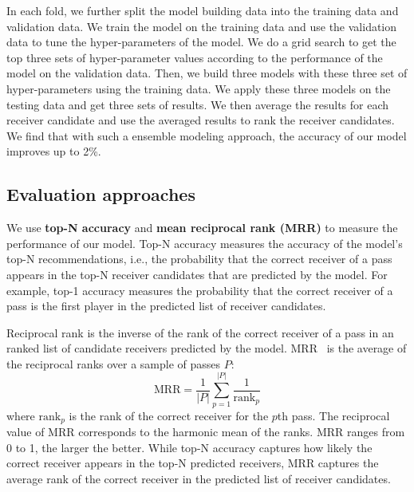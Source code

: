 In each fold, we further split the model building data into the training data and validation data.
We train the model on the training data and use the validation data to tune the hyper-parameters of the model. %
We do a grid search to get the top three sets of hyper-parameter values according to the performance of the model on the validation data.
Then, we build three models with these three set of hyper-parameters using the training data. 
We apply these three models on the testing data and get three sets of results.
We then average the results for each receiver candidate and use the averaged results to rank the receiver candidates. We find that with such a ensemble modeling approach, the accuracy of our model improves up to 2\%.%




\subsection{Evaluation approaches}\label{evaluation-approach}

We use \textbf{top-N accuracy} and \textbf{mean reciprocal rank (MRR)} to measure the performance of our model.
Top-N accuracy measures the accuracy of the model's top-N recommendations, i.e., the probability that the correct receiver of a pass appears in the top-N receiver candidates that are predicted by the model.
For example, top-1 accuracy measures the probability that the correct receiver of a pass is the first player in the predicted list of receiver candidates.

Reciprocal rank is the inverse of the rank of the correct receiver of a pass in an ranked list of candidate receivers predicted by the model.
MRR~\cite{Craswell2009} is the average of the reciprocal ranks over a sample of passes $P$:
\begin{equation}
  \textrm{MRR} = \frac{1}{|P|}\displaystyle\sum_{p=1}^{|P|}\frac{1}{\textrm{rank}_p}
\end{equation}
where $\textrm{rank}_p$ is the rank of the correct receiver for the $p$th pass.
The reciprocal value of MRR corresponds to the harmonic mean of the ranks.
MRR ranges from 0 to 1, the larger the better. 
While top-N accuracy captures how likely the correct receiver appears in the top-N predicted receivers, 
MRR captures the average rank of the correct receiver in the predicted list of receiver candidates.

